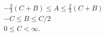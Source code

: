 \begin{equation}
\begin{array}{c}
    -\frac{2}{3}(C+B) \leq A \leq \frac{2}{3}(C+B)\\
    -C \leq B \leq C/2\\
    0 \leq C < \infty.
  \end{array}
\end{equation}

